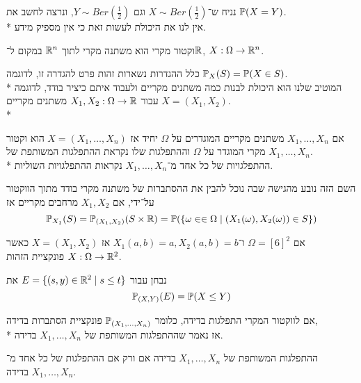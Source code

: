 \begin{example}
	נניח ש־$X \sim Ber(\frac{1}{2})$ וגם $Y \sim Ber(\frac{1}{2})$, ונרצה לחשב את $\mathbb{P}(X = Y)$. \\*
	אין לנו את היכולת לעשות זאת כי אין מספיק מידע.
\end{example}
\begin{definition}
	וקטור מקרי הוא משתנה מקרי לתוך $\mathbb{R}^n$ במקום ל־$\mathbb{R}$, $X : \Omega \to \mathbb{R}^n$.
\end{definition}
כלל ההגדרות נשארות זהות פרט להגדרה זו, לדוגמה $\mathbb{P}_X(S) = \mathbb{P}(X \in S)$. \\*
המוטיב שלנו הוא היכולת לבנות כמה משתנים מקריים ולעבוד איתם כיציר בודד, לדוגמה $X = (X_1, X_2)$ עבור $X_1, X_2 : \Omega \to \mathbb{R}$ משתנים מקריים. \\*
\begin{definition}
	אם $X_1, \dots, X_n$ משתנים מקריים המוגדרים על $\Omega$ יחיד אז $X = (X_1, \dots, X_n)$ הוא וקטור מקרי המוגדר על $\Omega$ וההתפלגות שלו נקראת ההתפלגות המשותפת של $X_1, \dots, X_n$. \\*
	ההתפלגויות של כל אחד מ־$X_1, \dots, X_n$ נקראות ההתפלגויות השוליות.
\end{definition}
השם הזה נובע מהגישה שבה נוכל להבין את ההסתברות של משתנה מקרי בודד מתוך הווקטור על־ידי, אם $X_1, X_2$ מרחבים מקריים אז
\[
	\mathbb{P}_{X_1}(S) = \mathbb{P}_{(X_1, X_2)}(S \times \mathbb{R}) = \mathbb{P}(\{\omega \in \in \Omega \mid (X_1(\omega), X_2(\omega)) \in S\})
\]
\begin{example}
	אם $\Omega = {[6]}^2$ ו־$X_1(a, b) = a, X_2(a, b) = b$ אז $X = (X_1, X_2)$ כאשר $X : \Omega \to \mathbb{R}^2$ פונקציית הזהות.
\end{example}
\begin{example}
	נבחן עבור $E = \{(s, y) \in \mathbb{R}^2 \mid s \le t\}$ את
	\[
		\mathbb{P}_{(X, Y)}(E)
		= \mathbb{P}(X \le Y)
	\]
\end{example}
\begin{definition}
	אם לווקטור המקרי התפלגות בדידה, כלומר $\mathbb{P}_{(X_1, \dots, X_n)}$ פונקציית הסתברות בדידה, \\*
	אז נאמר שההתפלגות המשותפת של $X_1, \dots, X_n$ בדידה.
\end{definition}
\begin{proposition}
	ההתפלגות המשותפת של $X_1, \dots, X_n$ בדידה אם ורק אם ההתפלגות של כל אחד מ־$X_1, \dots, X_n$ בדידה.
\end{proposition}
